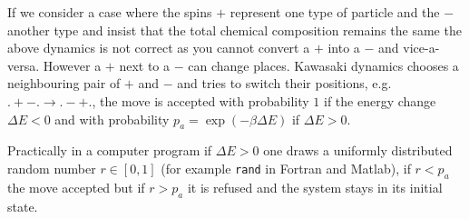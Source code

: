 \documentclass[11pt]{report}
\begin{document}
If we consider a case where the spins $+$ represent one type of particle and the $-$ another type and insist that the total  chemical composition remains the same the above dynamics is not correct as you cannot convert a $+$ into a $-$ and vice-a-versa. However a $+$ next to a $-$ can change places. Kawasaki dynamics chooses a neighbouring pair of $+$ and $-$ and tries to switch their positions, e.g. $.+-.\to .-+.$,  the move is accepted with probability $1$ if the energy change $\Delta E<0$  and with probability $p_a=\exp\left(-\beta\Delta E\right)$ if $\Delta E>0$.

Practically in a computer program if $\Delta E >0$ one draws a uniformly distributed random
number $r\in[0,1]$ (for example {\tt rand} in Fortran and Matlab), if $r< p_a $ the move accepted but if $r>p_a$ it is refused and the system stays in its initial state.
\end{document}
